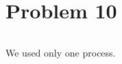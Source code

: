 \documentclass[paper=a4, fontsize=11pt]{scrartcl} %
\numberwithin{equation}{section} %
\numberwithin{figure}{section} %
\numberwithin{table}{section} %
\begin{document}

\section{Problem 10}
\inputminted{vhdl}{q7/src/fsm.vhd}
\par We used only one process.
\end{document}
